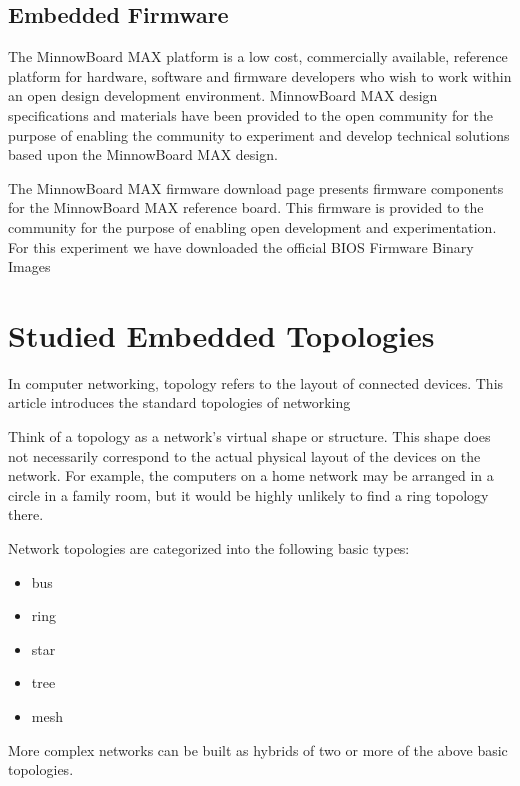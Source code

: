 \subsection{Embedded Firmware}

The  MinnowBoard MAX  platform is a low cost, commercially available, reference
platform for hardware, software and firmware developers who wish to work within
an open design development environment.  MinnowBoard MAX design specifications
and materials have been provided to the open community for the purpose of
enabling the community to experiment and develop technical solutions based upon
the  MinnowBoard MAX design.

The  MinnowBoard MAX firmware download page presents firmware components for the
 MinnowBoard MAX reference board. This firmware is provided to the community for
the purpose of enabling open development and experimentation. For this
experiment we have downloaded the official BIOS Firmware Binary Images
\cite{minnowmax-firmware}

\section{Studied Embedded Topologies}

In computer networking, topology refers to the layout of connected devices. This
article introduces the standard topologies of networking

Think of a topology as a network's virtual shape or structure. This shape does
not necessarily correspond to the actual physical layout of the devices on the
network. For example, the computers on a home network may be arranged in a
circle in a family room, but it would be highly unlikely to find a ring
topology there.

Network topologies are categorized into the following basic types:

\begin{itemize}
    \item bus
    \item ring
    \item star
    \item tree
    \item mesh
\end{itemize}

More complex networks can be built as hybrids of two or more of the above basic
topologies.


